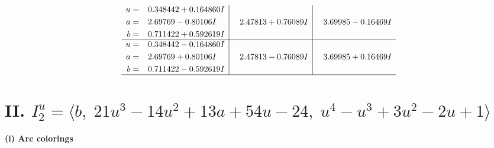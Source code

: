 \documentclass[1p]{elsarticle_modified}
\theoremstyle{definition}
\begin{document}
$$\begin{array}{c|c|c}
\begin{aligned}
u &= \phantom{-}0.348442 + 0.164860 I \\
a &= \phantom{-}2.69769 - 0.80106 I \\
b &= \phantom{-}0.711422 + 0.592619 I\end{aligned}
 & \phantom{-}2.47813 + 0.76089 I & \phantom{-}3.69985 - 0.16469 I \\ \hline\begin{aligned}
u &= \phantom{-}0.348442 - 0.164860 I \\
a &= \phantom{-}2.69769 + 0.80106 I \\
b &= \phantom{-}0.711422 - 0.592619 I\end{aligned}
 & \phantom{-}2.47813 - 0.76089 I & \phantom{-}3.69985 + 0.16469 I\\
 \hline 
 \end{array}$$\newpage\newpage\renewcommand{\arraystretch}{1}
\centering \section*{II. $I^u_{2}= \langle b,\;21 u^3-14 u^2+13 a+54 u-24,\;u^4- u^3+3 u^2-2 u+1 \rangle$}
\flushleft \textbf{(i) Arc colorings}\\
\end{document}
